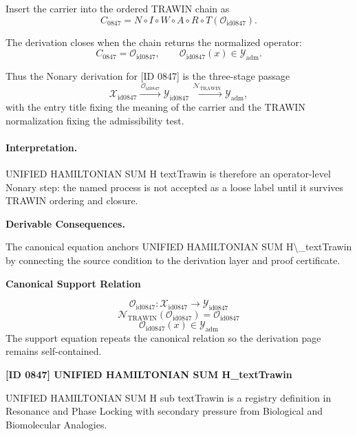 Insert the carrier into the ordered TRAWIN chain as\[
C_{0847}=N\circ I\circ W\circ A\circ R\circ T(\mathcal{O}_{\mathrm{id0847}}).
\]

The derivation closes when the chain returns the normalized operator:\[
C_{0847}=\mathcal{O}_{\mathrm{id0847}},\qquad \mathcal{O}_{\mathrm{id0847}}(x)\in\mathcal{Y}_{\mathrm{adm}}.
\]

Thus the Nonary derivation for [ID 0847] is the three-stage passage
\[
\mathcal{X}_{\mathrm{id0847}}\xrightarrow{\,\mathcal{O}_{\mathrm{id0847}}\,} \mathcal{Y}_{\mathrm{id0847}}\xrightarrow{\,\mathcal{N}_{\mathrm{TRAWIN}}\,} \mathcal{Y}_{\mathrm{adm}},
\]
with the entry title fixing the meaning of the carrier and the TRAWIN normalization fixing the admissibility test.

\paragraph{Interpretation.} UNIFIED HAMILTONIAN SUM H textTrawin is therefore an operator-level Nonary step: the named process is not accepted as a loose label until it survives TRAWIN ordering and closure.

\par\vspace{0.35em}
\noindent\textbf{Derivable Consequences.}\quad
\begingroup
\footnotesize
\raggedright
The canonical equation anchors UNIFIED HAMILTONIAN SUM H\textbackslash{}\_textTrawin by connecting the source condition to the derivation layer and proof certificate.
\par\endgroup

\noindent\textbf{Canonical Support Relation}\par
\[
\mathcal{O}_{\mathrm{id0847}}:\mathcal{X}_{\mathrm{id0847}}\longrightarrow\mathcal{Y}_{\mathrm{id0847}}
\]
\[
\mathcal{N}_{\mathrm{TRAWIN}}(\mathcal{O}_{\mathrm{id0847}})=\mathcal{O}_{\mathrm{id0847}}
\]
\[
\mathcal{O}_{\mathrm{id0847}}(x)\in\mathcal{Y}_{\mathrm{adm}}
\]
\noindent The support equation repeats the canonical relation so the derivation page remains self-contained.\par

\clearpage
\noindent\textbf{[ID 0847] UNIFIED HAMILTONIAN SUM H\_textTrawin}\par
\vspace{0.35em}
\begingroup\small
{}
UNIFIED HAMILTONIAN SUM H sub textTrawin is a registry definition in Resonance and Phase Locking with secondary pressure from Biological and Biomolecular Analogies.

